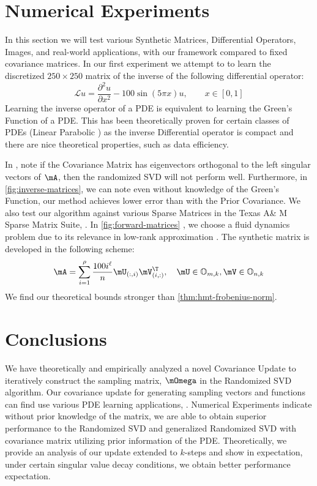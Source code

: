 \documentclass[10pt]{article}
\newcommand{\ccref}[1]{\textcolor{darkred}{\cref{#1}}}
\newcommand{\Ccref}[1]{\textcolor{darkred}{\Cref{#1}}}
\theoremstyle{plain}
\theoremstyle{definition}
\theoremstyle{remark}
\begin{document}
\section{Numerical Experiments}
In this section we will test various Synthetic Matrices, Differential Operators, Images, and real-world applications, with our framework compared to fixed covariance matrices.
In our first experiment we attempt to to learn the discretized $250 \times 250$ matrix of the inverse of the following differential operator:
\begin{equation} \label{eq:inverse-laplace}
    \mathcal{L}u = \frac{\partial^2 u}{\partial x^2} - 100 \sin\left(5\pi x\right)u,\qquad x \in \left[0,1\right]
\end{equation}
Learning the inverse operator of a PDE is equivalent to learning the Green's Function of a PDE. This has been theoretically proven for certain classes of PDEs (Linear Parabolic \cite{boulle:2022c,boulle:2023}) as the inverse Differential operator is compact and there are nice theoretical properties, such as data efficiency. 

In \Ccref{fig:inverse-matrices}\figright,
note if the Covariance Matrix has eigenvectors orthogonal to the left singular vectors of $\mA$, then the randomized SVD will not perform well. Furthermore, in \ccref{fig:inverse-matrices}\figleft, we can note even without knowledge of the Green's Function, our method achieves lower error than with the Prior Covariance. We also test our algorithm against various Sparse Matrices in the Texas A\& M Sparse Matrix Suite, \cite{davis:2011}. In \ccref{fig:forward-matrices} \figleft, we choose a fluid dynamics problem due to its relevance in low-rank approximation \cite{brunton:2020}. The synthetic matrix is developed in the following scheme:
\begin{equation} \label{eq:synthetic-matrix}
	\mA = \sum_{i=1}^{\rho} \frac{100i^{\ell}}{n}\mU_{(:,i)}\mV_{(i,:)}^{\T},\quad \mU \in \mathbb{O}_{m,k}, \mV \in \mathbb{O}_{n,k}
\end{equation}
We find our theoretical bounds stronger than \ccref{thm:hmt-frobenius-norm}.
\section{Conclusions}
We have theoretically and empirically analyzed a novel Covariance Update to iteratively construct the sampling matrix, $\mOmega$ in the Randomized SVD algorithm. Our covariance update for generating sampling vectors and functions can find use various PDE learning applications, \cite{boulle:2022b,brunton:2020}. Numerical Experiments indicate without prior knowledge of the matrix, we are able to obtain superior performance to the Randomized SVD and generalized Randomized SVD with covariance matrix utilizing prior information of the PDE. Theoretically, we provide an analysis of our update extended to $k$-steps and show in expectation, under certain singular value decay conditions, we obtain better performance expectation.
\end{document}

